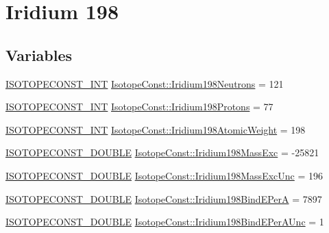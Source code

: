 \hypertarget{group___isotope_const-_iridium-_ir198}{}\section{Iridium 198}
\label{group___isotope_const-_iridium-_ir198}
\subsection*{Variables}
\begin{DoxyCompactItemize}
\item 
\mbox{\hyperlink{group___isotope_const-_macros_ga5f18360b3e99483a35c32d789e62621c}{I\+S\+O\+T\+O\+P\+E\+C\+O\+N\+S\+T\+\_\+\+I\+NT}} \mbox{\hyperlink{group___isotope_const-_iridium-_ir198_ga682c5fc956f006326885a92248bf9aa9}{Isotope\+Const\+::\+Iridium198\+Neutrons}} = 121
\item 
\mbox{\hyperlink{group___isotope_const-_macros_ga5f18360b3e99483a35c32d789e62621c}{I\+S\+O\+T\+O\+P\+E\+C\+O\+N\+S\+T\+\_\+\+I\+NT}} \mbox{\hyperlink{group___isotope_const-_iridium-_ir198_gae69c9450a295de99aa8605203f068554}{Isotope\+Const\+::\+Iridium198\+Protons}} = 77
\item 
\mbox{\hyperlink{group___isotope_const-_macros_ga5f18360b3e99483a35c32d789e62621c}{I\+S\+O\+T\+O\+P\+E\+C\+O\+N\+S\+T\+\_\+\+I\+NT}} \mbox{\hyperlink{group___isotope_const-_iridium-_ir198_ga373e75383837aac170f3d403e54de957}{Isotope\+Const\+::\+Iridium198\+Atomic\+Weight}} = 198
\item 
\mbox{\hyperlink{group___isotope_const-_macros_ga8f45a7272ce02c0b4c65c44636ed719a}{I\+S\+O\+T\+O\+P\+E\+C\+O\+N\+S\+T\+\_\+\+D\+O\+U\+B\+LE}} \mbox{\hyperlink{group___isotope_const-_iridium-_ir198_ga40010e014a9e69b687796dafdd8dbf73}{Isotope\+Const\+::\+Iridium198\+Mass\+Exc}} = -\/25821
\item 
\mbox{\hyperlink{group___isotope_const-_macros_ga8f45a7272ce02c0b4c65c44636ed719a}{I\+S\+O\+T\+O\+P\+E\+C\+O\+N\+S\+T\+\_\+\+D\+O\+U\+B\+LE}} \mbox{\hyperlink{group___isotope_const-_iridium-_ir198_gadef4137c124ffb8058686a3ce3c41509}{Isotope\+Const\+::\+Iridium198\+Mass\+Exc\+Unc}} = 196
\item 
\mbox{\hyperlink{group___isotope_const-_macros_ga8f45a7272ce02c0b4c65c44636ed719a}{I\+S\+O\+T\+O\+P\+E\+C\+O\+N\+S\+T\+\_\+\+D\+O\+U\+B\+LE}} \mbox{\hyperlink{group___isotope_const-_iridium-_ir198_ga23d9a207f902bde8174a05e7c5793a1b}{Isotope\+Const\+::\+Iridium198\+Bind\+E\+PerA}} = 7897
\item 
\mbox{\hyperlink{group___isotope_const-_macros_ga8f45a7272ce02c0b4c65c44636ed719a}{I\+S\+O\+T\+O\+P\+E\+C\+O\+N\+S\+T\+\_\+\+D\+O\+U\+B\+LE}} \mbox{\hyperlink{group___isotope_const-_iridium-_ir198_ga1df6bc642cccfe83f2af124d84e08e9a}{Isotope\+Const\+::\+Iridium198\+Bind\+E\+Per\+A\+Unc}} = 1

\end{DoxyCompactItemize}
